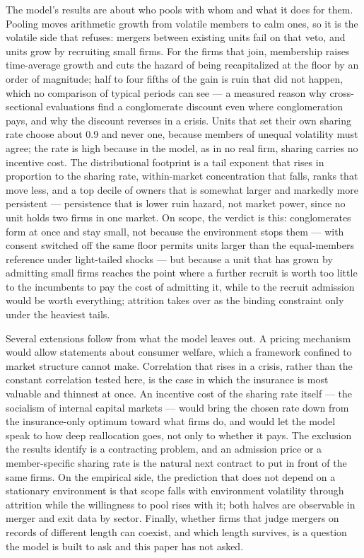 The model's results are about who pools with whom and what it does for them. Pooling moves arithmetic growth from volatile members to calm ones, so it is the volatile side that refuses: mergers between existing units fail on that veto, and units grow by recruiting small firms. For the firms that join, membership raises time-average growth and cuts the hazard of being recapitalized at the floor by an order of magnitude; half to four fifths of the gain is ruin that did not happen, which no comparison of typical periods can see --- a measured reason why cross-sectional evaluations find a conglomerate discount even where conglomeration pays, and why the discount reverses in a crisis. Units that set their own sharing rate choose about 0.9 and never one, because members of unequal volatility must agree; the rate is high because in the model, as in no real firm, sharing carries no incentive cost. The distributional footprint is a tail exponent that rises in proportion to the sharing rate, within-market concentration that falls, ranks that move less, and a top decile of owners that is somewhat larger and markedly more persistent --- persistence that is lower ruin hazard, not market power, since no unit holds two firms in one market. On scope, the verdict is this: conglomerates form at once and stay small, not because the environment stops them --- with consent switched off the same floor permits units larger than the equal-members reference under light-tailed shocks --- but because a unit that has grown by admitting small firms reaches the point where a further recruit is worth too little to the incumbents to pay the cost of admitting it, while to the recruit admission would be worth everything; attrition takes over as the binding constraint only under the heaviest tails.

Several extensions follow from what the model leaves out. A pricing mechanism would allow statements about consumer welfare, which a framework confined to market structure cannot make. Correlation that rises in a crisis, rather than the constant correlation tested here, is the case in which the insurance is most valuable and thinnest at once. An incentive cost of the sharing rate itself --- the socialism of internal capital markets --- would bring the chosen rate down from the insurance-only optimum toward what firms do, and would let the model speak to how deep reallocation goes, not only to whether it pays. The exclusion the results identify is a contracting problem, and an admission price or a member-specific sharing rate is the natural next contract to put in front of the same firms. On the empirical side, the prediction that does not depend on a stationary environment is that scope falls with environment volatility through attrition while the willingness to pool rises with it; both halves are observable in merger and exit data by sector. Finally, whether firms that judge mergers on records of different length can coexist, and which length survives, is a question the model is built to ask and this paper has not asked.
